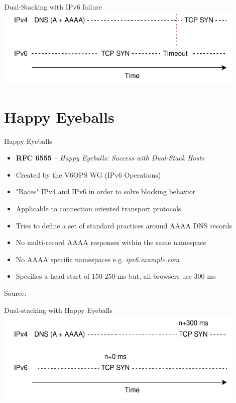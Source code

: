 \documentclass[aspectratio=169]{beamer}
\begin{document}
\begin{frame}{Dual-Stacking with IPv6 failure}
  \centering
  \includegraphics[width=0.9\textwidth]{nohe.pdf}
\end{frame}

\section{Happy Eyeballs}

\begin{frame}{Happy Eyeballs}
  \begin{itemize}
    \item \textbf{RFC 6555} – \emph{Happy Eyeballs: Success with Dual-Stack Hosts}
    \item Created by the V6OPS WG (IPv6 Operations)
    \item "Races" IPv4 and IPv6 in order to solve blocking behavior
    \item Applicable to connection oriented transport protocols
    \item Tries to define a set of standard practices around AAAA DNS records
    \item No multi-record AAAA responses within the same namespace
    \item No AAAA specific namespaces e.g. \textit{ipv6.example.com}
    \item Specifies a head start of 150-250 ms but, all browsers use 300 ms
  \end{itemize}
  \centering
  {\tiny Source: }
\end{frame}

\begin{frame}{Dual-stacking with Happy Eyeballs}
  \centering
  \includegraphics[width=0.9\textwidth]{withhe.pdf}
\end{frame}
\end{document}
